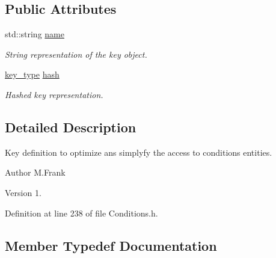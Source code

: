 \subsection*{Public Attributes}
\begin{DoxyCompactItemize}
\item 
std\+::string \hyperlink{class_d_d4hep_1_1_conditions_1_1_condition_key_a37729a238b66d69101805d98199544c1}{name}
\begin{DoxyCompactList}\small\item\em String representation of the key object. \end{DoxyCompactList}\item 
\hyperlink{class_d_d4hep_1_1_conditions_1_1_condition_key_a08bfc8ccb807bdd5e4d9f3b065d1c8f5}{key\+\_\+type} \hyperlink{class_d_d4hep_1_1_conditions_1_1_condition_key_a6eb2b4ac135f9ca4e35737a4d64c16b3}{hash}
\begin{DoxyCompactList}\small\item\em Hashed key representation. \end{DoxyCompactList}\end{DoxyCompactItemize}


\subsection{Detailed Description}
Key definition to optimize ans simplyfy the access to conditions entities. 

\begin{DoxyAuthor}{Author}
M.\+Frank 
\end{DoxyAuthor}
\begin{DoxyVersion}{Version}
1. 
\end{DoxyVersion}


Definition at line 238 of file Conditions.\+h.



\subsection{Member Typedef Documentation}
\hypertarget{class_d_d4hep_1_1_conditions_1_1_condition_key_a08bfc8ccb807bdd5e4d9f3b065d1c8f5}{}\label{class_d_d4hep_1_1_conditions_1_1_condition_key_a08bfc8ccb807bdd5e4d9f3b065d1c8f5} 
